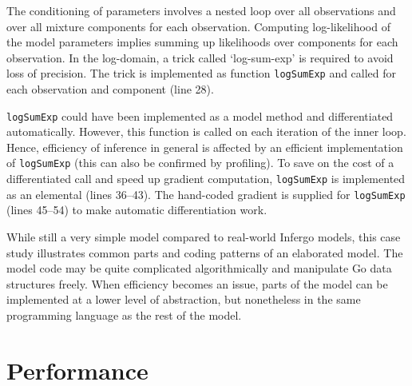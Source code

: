 \documentclass[sigplan,10pt,screen]{acmart}
\begin{document}
\begin{sloppypar}
The conditioning of parameters involves a nested loop over all
observations and over all mixture components for each
observation.  Computing log-likelihood of the model parameters
implies summing up likelihoods over components for each
observation.  In the log-domain, a trick called `log-sum-exp' is
required to avoid loss of precision. The trick is implemented
as function \lstinline{logSumExp} and called for each
observation and component (line 28).

\lstinline{logSumExp} could have been implemented as a model
method and differentiated automatically. However, this function
is called on each iteration of the inner loop. Hence,
efficiency of inference in general is affected by
an efficient implementation of \lstinline{logSumExp} (this can
also be confirmed by profiling). To save on the cost of a
differentiated call and speed up gradient computation,
\lstinline{logSumExp} is implemented as an elemental (lines
36--43). The hand-coded gradient is supplied for
\lstinline{logSumExp} (lines 45--54) to make automatic
differentiation work.

While still a very simple model compared to real-world Infergo
models, this case study illustrates common parts and coding
patterns of an elaborated model. The model code may be quite
complicated algorithmically and manipulate Go data structures
freely. When efficiency becomes an issue, parts of the model
can be implemented at a lower level of abstraction, but
nonetheless in the same programming language as the rest of the
model.

\section{Performance}


\end{sloppypar}
\end{document}

